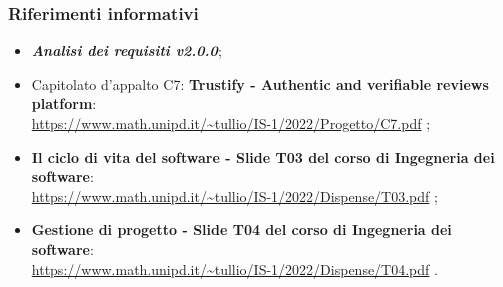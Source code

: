 \subsubsection{Riferimenti informativi}
\begin{itemize}
    \item \textbf{\textit{Analisi dei requisiti v2.0.0}};
    \item Capitolato d'appalto C7: \textbf{Trustify - Authentic and verifiable reviews platform}: \\
          \url{https://www.math.unipd.it/~tullio/IS-1/2022/Progetto/C7.pdf} \hfill{};
    \item \textbf{Il ciclo di vita del software - Slide T03 del corso di Ingegneria dei software}: \\
          \url{https://www.math.unipd.it/~tullio/IS-1/2022/Dispense/T03.pdf} \hfill{};
    \item \textbf{Gestione di progetto - Slide T04 del corso di Ingegneria dei software}: \\
          \url{https://www.math.unipd.it/~tullio/IS-1/2022/Dispense/T04.pdf} \hfill{}.
\end{itemize}
